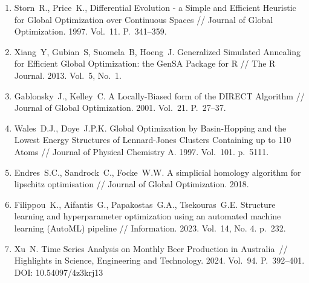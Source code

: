 \documentclass[a4paper,12pt,russian]{article}
\begin{document}
\begin{enumerate}
\item \label{rfa:rulit:differential_evolution}
Storn~R., Price~K., Differential Evolution - a Simple and Efficient Heuristic for Global Optimization over Continuous Spaces //
Journal of Global Optimization. 1997. Vol.~11. P.~341--359.

\item \label{rfa:rulit:dual_annealing}
Xiang~Y, Gubian~S, Suomela~B, Hoeng~J. Generalized Simulated Annealing for Efficient Global Optimization: the GenSA Package for R // The R Journal. 2013. Vol.~5, No.~1.

\item \label{rfa:rulit:direct}
Gablonsky~J., Kelley~C. A Locally-Biased form of the DIRECT Algorithm // Journal of Global Optimization. 2001. Vol.~21. P.~27--37.

\item \label{rfa:rulit:basinhopping}
Wales~D.J., Doye~J.P.K. Global Optimization by Basin-Hopping and the Lowest Energy Structures of Lennard-Jones Clusters Containing up to 110 Atoms // Journal of Physical Chemistry A. 1997. Vol.~101. p.~5111.

\item \label{rfa:rulit:shgo}
Endres~S.C., Sandrock~C., Focke~W.W. A simplicial homology algorithm for lipschitz optimisation // Journal of Global Optimization. 2018.


\item \label{rfa:rulit:nikitin2022automated}
Filippou~K., Aifantis~G., Papakostas~G.A., Tsekouras~G.E. Structure learning and hyperparameter optimization using an automated machine learning ({AutoML}) pipeline // Information. 2023. Vol.~14, No. 4. p.~232.

\item \label{rfa:rulit:MonthlyBeerArticle}
Xu~N. Time Series Analysis on Monthly Beer Production in Australia~// Highlights in Science, Engineering and Technology. 2024. Vol.~94. P.~392--401. DOI: 10.54097/4z3krj13





\end{enumerate}
\end{document}
